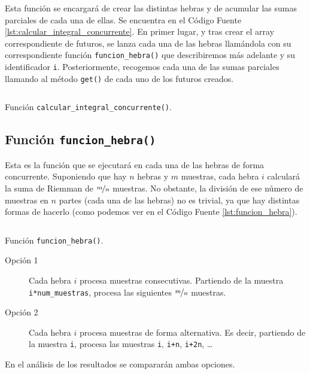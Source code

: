 \documentclass[12pt]{article}
\begin{document}
Esta función se encargará de crear las distintas hebras y de acumular las sumas parciales de cada una de ellas. Se encuentra en el Código Fuente \ref{lst:calcular_integral_concurrente}.
En primer lugar, y tras crear el array correspondiente de futuros, se lanza cada una de las hebras llamándola con su correspondiente función \texttt{funcion_hebra()} que describiremos más adelante y su identificador \verb|i|.
Posteriormente, recogemos cada una de las sumas parciales llamando al método \texttt{get()} de cada uno de los futuros creados.
\begin{listing}
    \inputminted[firstline=89, lastline=103]{c++}{./Programas/S1_Integracion.cpp}
    \caption{Función \texttt{calcular_integral_concurrente()}.}
    \label{lst:calcular_integral_concurrente}
\end{listing}

\subsection{Función \texttt{funcion_hebra()}}

Esta es la función que se ejecutará en cada una de las hebras de forma concurrente.
Suponiendo que hay $n$ hebras y $m$ muestras, cada hebra $i$ calculará la suma de Riemman de $\nicefrac{m}{n}$ muestras.
No obstante, la división de ese número de muestras en $n$ partes (cada una de las hebras) no es trivial, ya que hay distintas formas de hacerlo
(como podemos ver en el Código Fuente \ref{lst:funcion_hebra}).
\begin{listing}
    \inputminted[firstline=62, lastline=82]{c++}{./Programas/S1_Integracion.cpp}
    \caption{Función \texttt{funcion_hebra()}.}
    \label{lst:funcion_hebra}
\end{listing}
\begin{description}
    \item[Opción 1] Cada hebra $i$ procesa muestras consecutivas.
    Partiendo de la muestra \texttt{i*num_muestras}, procesa las siguientes $\nicefrac{m}{n}$ muestras.

    \item[Opción 2] Cada hebra $i$ procesa muestras de forma alternativa.
    Es decir, partiendo de la muestra \texttt{i}, procesa las muestras \texttt{i}, \texttt{i+n}, \texttt{i+2n}, \ldots
\end{description}

En el análisis de los resultados se compararán ambas opciones.
\end{document}
